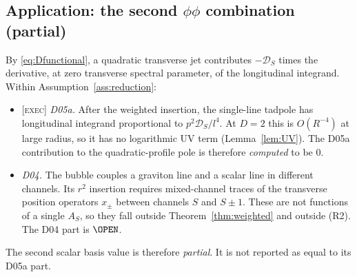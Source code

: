 \subsection{Application: the second \texorpdfstring{\(\phi\phi\)}{phi-phi} combination (partial)}

By \eqref{eq:Dfunctional}, a quadratic transverse jet contributes
\(-\mathcal D_S\) times the derivative, at zero transverse spectral
parameter, of the longitudinal integrand.
Within Assumption~\ref{ass:reduction}:
\begin{itemize}
\item \textsc{[exec]} \emph{D05a.} After the weighted insertion,
the single-line tadpole has longitudinal integrand proportional to
\(p^2\mathcal D_S/l^4\).
At \(D=2\) this is \(O(R^{-4})\) at large radius, so it has no
logarithmic UV term (Lemma~\ref{lem:UV}).
The D05a contribution to the quadratic-profile pole is therefore
\emph{computed} to be \(0\).
\item \emph{D04.} The bubble couples a graviton line and a scalar
line in different channels.
Its \(r^2\) insertion requires mixed-channel traces of the
transverse position operators \(x_\pm\) between channels \(S\) and
\(S\pm1\).
These are not functions of a single \(A_S\), so they fall outside
Theorem~\ref{thm:weighted} and outside (R2).
The D04 part is \(\OPEN\).
\end{itemize}
The second scalar basis value is therefore \emph{partial}.
It is not reported as equal to its D05a part.
